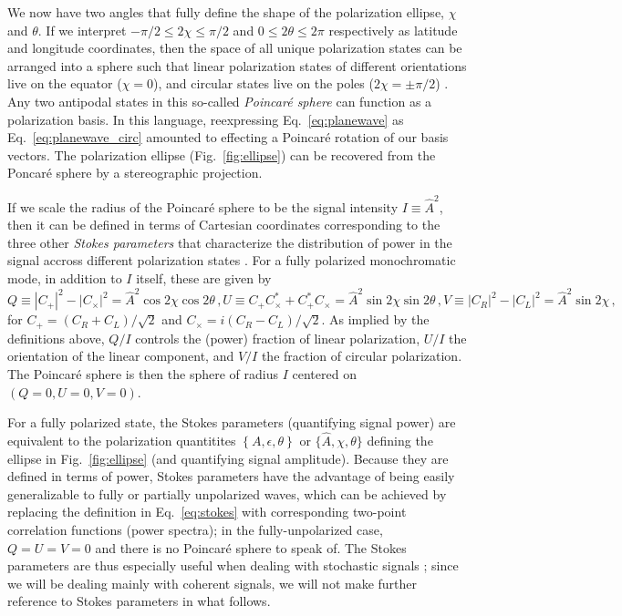 \documentclass[aps,prd,twocolumn,superscriptaddress,preprintnumbers,floatfix,nofootinbib]{revtex4-2}
\newcommand{\beq}{\begin{equation}}
\newcommand{\eeq}{\end{equation}}
\begin{document}
We now have two angles that fully define the shape of the polarization ellipse, $\chi$ and $\theta$.
If we interpret $-\pi/2 \leq 2\chi \leq \pi/2$ and $0 \leq 2\theta \leq 2\pi$ respectively as latitude and longitude coordinates, then the space of all unique polarization states can be arranged into a sphere such that linear polarization states of different orientations live on the equator ($\chi = 0$), and circular states live on the poles ($2\chi = \pm \pi/2$) \cite{poincare,goldstein}.
Any two antipodal states in this so-called \emph{Poincar\'e sphere} can function as a polarization basis.
In this language, reexpressing Eq.~\eqref{eq:planewave} as Eq.~\eqref{eq:planewave_circ} amounted to effecting a Poincar\'{e} rotation of our basis vectors.
The polarization ellipse (Fig.~\ref{fig:ellipse}) can be recovered from the Poncar\'e sphere by a stereographic projection.

If we scale the radius of the Poincar\'{e} sphere to be the signal intensity $I \equiv \hat{A}^2$, then it can be defined in terms of Cartesian coordinates corresponding to the three other \emph{Stokes parameters} that characterize the distribution of power in the signal accross different polarization states \cite{Anile1974}.
For a fully polarized monochromatic mode, in addition to $I$ itself, these are given by
\begin{subequations} \label{eq:stokes}
\beq
Q \equiv |C_+|^2 - |C_\times|^2 = \hat{A}^2 \cos 2\chi \cos 2\theta \, , 
\eeq
\beq
U \equiv C_+ C_\times^* + C_+^* C_\times = \hat{A}^2 \sin2\chi \sin 2\theta \,  ,
\eeq
\beq
V \equiv |C_R|^2 - |C_L|^2 = \hat{A}^2 \sin 2\chi \, ,
\eeq 
\end{subequations}
for $C_+ = (C_R + C_L)/\sqrt{2}$ and $C_\times = i (C_R - C_L)/\sqrt{2}$.
As implied by the definitions above, $Q/I$ controls the (power) fraction of linear polarization, $U/I$ the orientation of the linear component, and $V/I$ the fraction of circular polarization.
The Poincar\'{e} sphere is then the sphere of radius $I$ centered on $\left(Q=0, U=0, V=0\right)$.

For a fully polarized state, the Stokes parameters (quantifying signal power) are equivalent to the polarization quantitites $\left\{A, \epsilon, \theta\right\}$ or $\{\hat{A}, \chi, \theta\}$ defining the ellipse in Fig.~\ref{fig:ellipse} (and quantifying signal amplitude).
Because they are defined in terms of power, Stokes parameters have the advantage of being easily generalizable to fully or partially unpolarized waves, which can be achieved by replacing the definition in Eq.~\eqref{eq:stokes} with corresponding two-point correlation functions (power spectra); in the fully-unpolarized case, $Q=U=V=0$ and there is no Poincar\'{e} sphere to speak of.
The Stokes parameters are thus especially useful when dealing with stochastic signals \cite{Romano:2016dpx,Conneely:2018wis,Seto:2008sr,Kato:2015bye}; since we will be dealing mainly with coherent signals, we will not make further reference to Stokes parameters in what follows.
\end{document}
